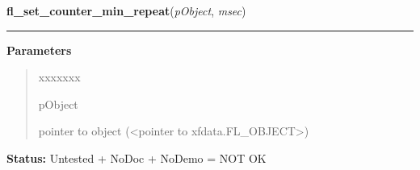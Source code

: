 \hspace{.8\funcindent}\begin{boxedminipage}{\funcwidth}

    \raggedright \textbf{fl\_set\_counter\_min\_repeat}(\textit{pObject}, \textit{msec})

    \vspace{-1.5ex}

    \rule{\textwidth}{0.5\fboxrule}
\setlength{\parskip}{2ex}
\setlength{\parskip}{1ex}
      \textbf{Parameters}
      \vspace{-1ex}

      \begin{quote}
        \begin{Ventry}{xxxxxxx}

          \item[pObject]

          pointer to object ({\textless}pointer to 
          xfdata.FL\_OBJECT{\textgreater})

        \end{Ventry}

      \end{quote}

\textbf{Status:} Untested + NoDoc + NoDemo = NOT OK



    \end{boxedminipage}

    \label{xformslib:library:fl_get_counter_speedjump}

    \vspace{0.5ex}

